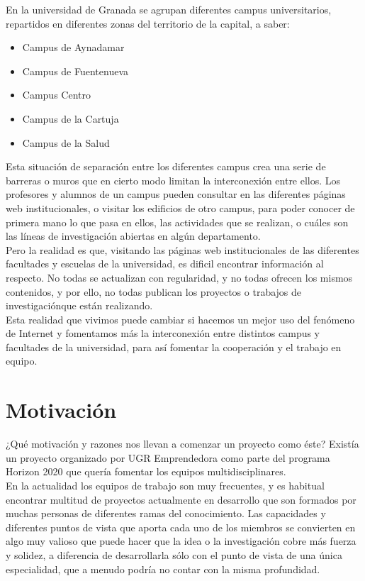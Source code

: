 En la universidad de Granada se agrupan diferentes campus universitarios, repartidos en diferentes zonas del territorio de la capital, a saber:

\begin{itemize}
    \item Campus de Aynadamar
    \item Campus de Fuentenueva
    \item Campus Centro
    \item Campus de la Cartuja
    \item Campus de la Salud
\end{itemize}

Esta situación de separación entre los diferentes campus crea una serie de barreras o muros que en cierto modo limitan la interconexión entre ellos. Los profesores y alumnos de un campus pueden consultar en las diferentes páginas web institucionales, o visitar los edificios de otro campus, para poder conocer de primera mano lo que pasa en ellos, las actividades que se realizan, o cuáles son las líneas de investigación abiertas en algún departamento.\\

Pero la realidad es que, visitando las páginas web institucionales de las diferentes facultades y escuelas de la universidad, es dificil encontrar información al respecto. No todas se actualizan con regularidad, y no todas ofrecen los mismos contenidos, y por ello, no todas publican los proyectos o trabajos de investigaciónque están realizando.\\

Esta realidad que vivimos puede cambiar si hacemos un mejor uso del fenómeno de Internet y fomentamos más la interconexión entre distintos campus y facultades de la universidad, para así fomentar la cooperación y el trabajo en equipo.

\section{Motivación}
¿Qué motivación y razones nos llevan a comenzar un proyecto como éste? Existía un proyecto organizado por UGR Emprendedora \cite{ugremprende} como parte del programa Horizon 2020 \cite{h2020} que quería fomentar los equipos multidisciplinares.\\

En la actualidad los equipos de trabajo son muy frecuentes, y es habitual encontrar multitud de proyectos actualmente en desarrollo que son formados por muchas personas de diferentes ramas del conocimiento. Las capacidades y diferentes puntos de vista que aporta cada uno de los miembros se convierten en algo muy valioso que puede hacer que la idea o la investigación cobre más fuerza y solidez, a diferencia de desarrollarla sólo con el punto de vista de una única especialidad, que a menudo podría no contar con la misma profundidad.\\

